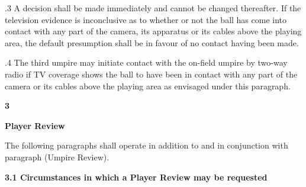 \documentclass[12pt]{article}
\begin{document}
\vspace{\baselineskip}
\begin{adjustwidth}{0.5in}{0.03in}
{\fontsize{9pt}{10.8pt}.3 \tabto{0.49in} A decision shall be made immediately and cannot be changed thereafter. If the television evidence is inconclusive as to whether or not the ball has come into contact with any part of the camera, its apparatus or its cables above the playing area, the default presumption shall be in favour of no contact having been made.\par}\par

\end{adjustwidth}


\vspace{\baselineskip}
\begin{adjustwidth}{0.5in}{0.01in}
\begin{justify}
{\fontsize{9pt}{10.8pt}.4 \tabto{0.49in} The third umpire may initiate contact with the on-field umpire by two-way radio if TV coverage shows the ball to have been in contact with any part of the camera or its cables above the playing area as envisaged under this paragraph.\par}
\end{justify}\par

\end{adjustwidth}


\vspace{\baselineskip}
{\fontsize{16pt}{19.2pt}\selectfont \textbf{3 \tabto{0.29in} }{\fontsize{15pt}{18.0pt}\selectfont \textbf{Player Review}\par}\par}\par


\vspace{\baselineskip}
\begin{adjustwidth}{0.49in}{0.0in}
{\fontsize{9pt}{10.8pt}\selectfont The following paragraphs shall operate in addition to and in conjunction with paragraph (Umpire Review).\par}\par

\end{adjustwidth}


\vspace{\baselineskip}
{\fontsize{11pt}{13.2pt}\selectfont \textbf{3.1 \tabto{0.47in} Circumstances in which a Player Review may be requested}\par}\par
\end{document}
